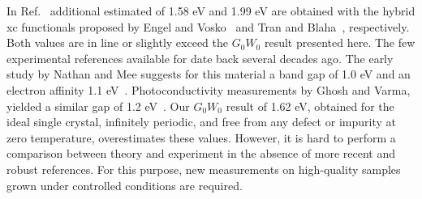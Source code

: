 \documentclass[aps,pra,superscriptaddress,twocolumn]{revtex4}
\begin{document}
In Ref.~\cite{murt+16bms} additional estimated of 1.58 eV and 1.99 eV are obtained with the hybrid xc functionals proposed by Engel and Vosko~\cite{enge-vosk93prb} and Tran and Blaha~\cite{tran-blah09prl}, respectively.
Both values are in line or slightly exceed the $G_0W_0$ result presented here.
The few experimental references available for  date back several decades ago. 
The early study by Nathan and Mee suggests for this material a band gap of 1.0 eV and an electron affinity 1.1 eV~\cite{nath-mee67ije}.
Photoconductivity measurements by Ghosh and Varma, yielded a similar gap of 1.2 eV~\cite{ghos-varm78jap}.
Our $G_0W_0$ result of 1.62 eV, obtained for the ideal single crystal, infinitely periodic, and free from any defect or impurity at zero temperature, overestimates these values.
However, it is hard to perform a comparison between theory and experiment in the absence of more recent and robust references. 
For this purpose, new measurements on high-quality samples grown under controlled conditions are required. 
\end{document}
